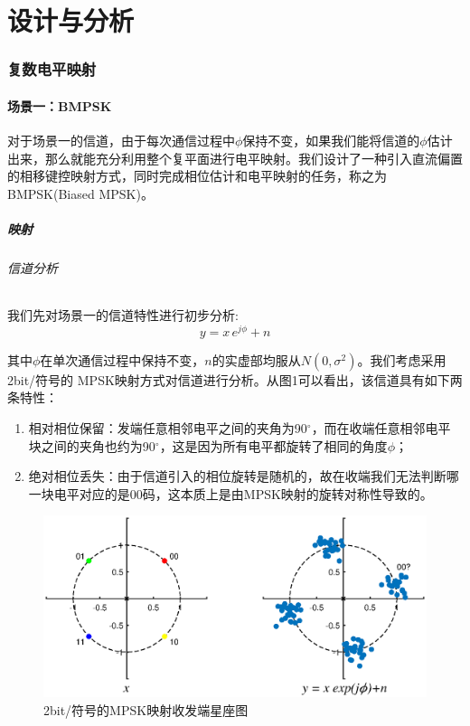 \part{设计与分析}

\section{复数电平映射}

\subsection{场景一：BMPSK}

对于场景一的信道，由于每次通信过程中$\phi$保持不变，如果我们能将信道的$\phi$估计出来，那么就能充分利用整个复平面进行电平映射。我们设计了一种引入直流偏置的相移键控映射方式，同时完成相位估计和电平映射的任务，称之为BMPSK(Biased MPSK)。

\subsubsection{映射}

\paragraph{信道分析}
\indent

我们先对场景一的信道特性进行初步分析:
\begin{equation*}
    y=x\,e^{j\phi}+n
\end{equation*}

其中$\phi$在单次通信过程中保持不变，$n$的实虚部均服从$N(0,\sigma^2)$。我们考虑采用2bit/符号的 MPSK映射方式对信道进行分析。从图1可以看出，该信道具有如下两条特性：

\begin{enumerate}
    \item 相对相位保留：发端任意相邻电平之间的夹角为90$^{\circ}$，而在收端任意相邻电平块之间的夹角也约为90$^{\circ}$，这是因为所有电平都旋转了相同的角度$\phi$；
    \item 绝对相位丢失：由于信道引入的相位旋转是随机的，故在收端我们无法判断哪一块电平对应的是00码，这本质上是由MPSK映射的旋转对称性导致的。
\end{enumerate}

\begin{figure}[h]
    \centering
    \includegraphics[width=\textwidth]{pic/1-1-1.eps}
    \caption{2bit/符号的MPSK映射收发端星座图}
\end{figure}

